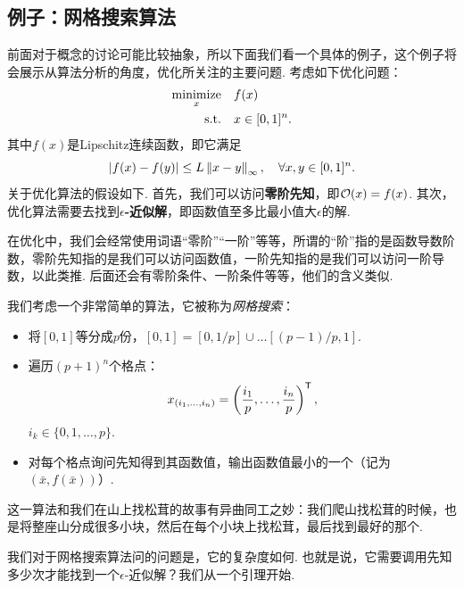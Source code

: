 \subsection{例子：网格搜索算法}

前面对于概念的讨论可能比较抽象，所以下面我们看一个具体的例子，这个例子将会展示从算法分析的角度，优化所关注的主要问题. 考虑如下优化问题：
\begin{equation}
    \begin{aligned}
    \operatorname*{minimize}_{x}&\quad f(x)\\
    \text{s.t.}&\quad x\in[0,1]^n.
\end{aligned}\label{opt:grid-search}
\end{equation}
其中$f(x)$是Lipschitz连续函数，即它满足
    \[|f(x)-f(y)|\leq L\left\|x-y\right\|_\infty,\quad\forall x,y\in[0,1]^n.\]
关于优化算法的假设如下. 首先，我们可以访问\textbf{零阶先知}，即$\mathcal{O}(x)=f(x)$. 其次，优化算法需要去找到\textbf{$\epsilon$-近似解}，即函数值至多比最小值大$\epsilon$的解.

\begin{remark}
    在优化中，我们会经常使用词语“零阶”“一阶”等等，所谓的“阶”指的是函数导数阶数，零阶先知指的是我们可以访问函数值，一阶先知指的是我们可以访问一阶导数，以此类推. 后面还会有零阶条件、一阶条件等等，他们的含义类似. 
\end{remark}

我们考虑一个非常简单的算法，它被称为\textit{网格搜索}：
\begin{itemize}
    \item 将$[0,1]$等分成$p$份，$[0,1]=[0,1/p]\cup\dots[(p-1)/p,1]$.
    \item 遍历$(p+1)^n$个格点：
    \[x_{(i_1,\dots,i_n)}=\left(\frac{i_1}{p},\dots,\frac{i_n}{p}\right)^{\mathsf{T}},\]
    $i_k\in\{0,1,\dots,p\}$.
    \item 对每个格点询问先知得到其函数值，输出函数值最小的一个（记为$(\bar{x},f(\bar x))$）.
\end{itemize}

这一算法和我们在山上找松茸的故事有异曲同工之妙：我们爬山找松茸的时候，也是将整座山分成很多小块，然后在每个小块上找松茸，最后找到最好的那个.

我们对于网格搜索算法问的问题是，它的复杂度如何. 也就是说，它需要调用先知多少次才能找到一个$\epsilon$-近似解？我们从一个引理开始. 

